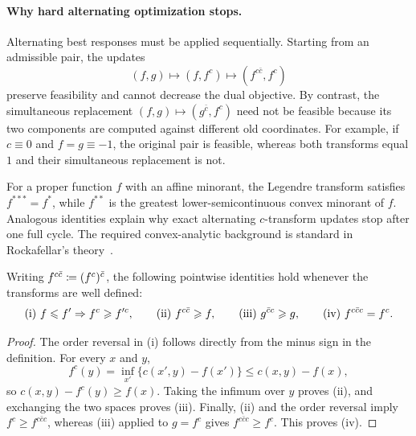 \paragraph{Why hard alternating optimization stops.}

Alternating best responses must be applied sequentially. Starting from an admissible pair, the updates
\[
	(f,g)\longmapsto(f,f^c)\longmapsto(f^{c\bar c},f^c)
\]
preserve feasibility and cannot decrease the dual objective. By contrast, the simultaneous replacement $(f,g)\mapsto(g^{\bar c},f^c)$ need not be feasible because its two components are computed against different old coordinates. For example, if $c\equiv0$ and $f=g\equiv-1$, the original pair is feasible, whereas both transforms equal $1$ and their simultaneous replacement is not.

For a proper function $f$ with an affine minorant, the Legendre transform satisfies $f^{***}=f^*$, while $f^{**}$ is the greatest lower-semicontinuous convex minorant of $f$. Analogous identities explain why exact alternating $c$-transform updates stop after one full cycle. The required convex-analytic background is standard in Rockafellar's theory~\cite{rockafellar2015convex}.

\begin{prop}\label{prop-c-transform-algebra}
Writing $f^{c\bar c}\coloneqq(f^c)^{\bar c}$, the following pointwise identities hold whenever the transforms are well defined:
	\[
		\textnormal{(i) } f \leqslant f' \Rightarrow f^{c}\geqslant f'^{c},
		\qquad
		\textnormal{(ii) } f^{c\bar{c}} \geqslant f,
		\qquad
		\textnormal{(iii) } g^{\bar{c}c} \geqslant g,
		\qquad
		\textnormal{(iv) } f^{c\bar{c}c}=f^{c}.
	\]
\end{prop}

\begin{proof}
	The order reversal in (i) follows directly from the minus sign in the definition. For every $x$ and $y$,
	\[
		f^c(y)=\inf_{x'}\{c(x',y)-f(x')\}
		\leq c(x,y)-f(x),
	\]
	so $c(x,y)-f^c(y)\geq f(x)$. Taking the infimum over $y$ proves (ii), and exchanging the two spaces proves (iii). Finally, (ii) and the order reversal imply
	$f^c\geq f^{c\bar c c}$, whereas (iii) applied to $g=f^c$ gives
	$f^{c\bar c c}\geq f^c$. This proves (iv).
\end{proof}

